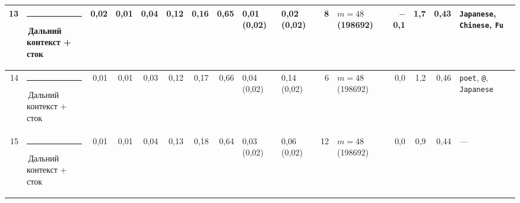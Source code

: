 \documentclass[10pt]{article}
\begin{document}
\begin{minipage}{\linewidth}
\begin{center}
{\begin{tabular}{|r|l|r|r|r|r|r|r|l|l|r|l|r|r|r|l|}
13 & \textcolor[HTML]{C3C2B7}{\rule{0.62em}{0.62em}}\,Дальний контекст + сток & 0,02 & 0,01 & 0,04 & 0,12 & 0,16 & 0,65 & 0,01 (0,02) & 0,02 (0,02) & 8 & $m{=}48$ (198692) & $-$0,1 & 1,7 & 0,43 & \texttt{\textvisiblespace{}Japanese}, \texttt{\textvisiblespace{}Chinese}, \texttt{\textvisiblespace{}Fu} \\ \hline
14 & \textcolor[HTML]{C3C2B7}{\rule{0.62em}{0.62em}}\,Дальний контекст + сток & 0,01 & 0,01 & 0,03 & 0,12 & 0,17 & 0,66 & 0,04 (0,02) & 0,14 (0,02) & 6 & $m{=}48$ (198692) & 0,0 & 1,2 & 0,46 & \texttt{\textvisiblespace{}poet}, \texttt{\textvisiblespace{}@}, \texttt{\textvisiblespace{}Japanese} \\ \hline
15 & \textcolor[HTML]{C3C2B7}{\rule{0.62em}{0.62em}}\,Дальний контекст + сток & 0,01 & 0,01 & 0,04 & 0,13 & 0,18 & 0,64 & 0,03 (0,02) & 0,06 (0,02) & 12 & $m{=}48$ (198692) & 0,0 & 0,9 & 0,44 & — \\ \hline
\hline\end{tabular}}\end{center}
\end{minipage}
\par\vspace{0.4em}
\end{document}
